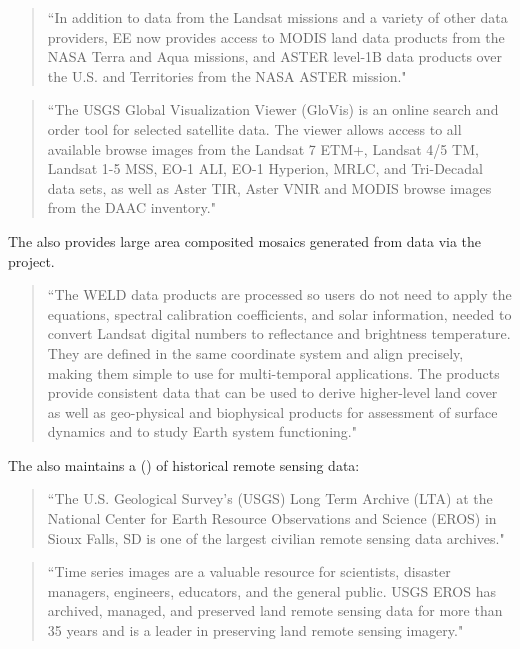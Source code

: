 \documentclass{article}
\begin{document}
\begin{quote}
``In addition to data from the Landsat missions and a variety of other data
providers, EE now provides access to MODIS land data products from the NASA
Terra and Aqua missions, and ASTER level-1B data products over the U.S. and
Territories from the NASA ASTER mission."
\end{quote}

\begin{quote}
``The USGS Global Visualization Viewer (GloVis) is an online search and order
tool for selected satellite data. The viewer allows access to all available
browse images from the Landsat 7 ETM+, Landsat 4/5 TM, Landsat 1-5 MSS,
EO-1 ALI, EO-1 Hyperion, MRLC, and Tri-Decadal data sets, as well as Aster
TIR, Aster VNIR and MODIS browse images from the DAAC inventory."
\end{quote}

The \cite{usgs} also provides large area composited mosaics generated from
\cite{landsat} data via the \cite{weld} project.

\begin{quote}
``The WELD data products are processed so users do not need to apply the
equations, spectral calibration coefficients, and solar information, needed
to convert Landsat digital numbers to reflectance and brightness temperature.
They are defined in the same coordinate system and align precisely, making
them simple to use for multi-temporal applications.
The products provide consistent data that can be used to derive higher-level
land cover as well as geo-physical and biophysical products for assessment
of surface dynamics and to study Earth system functioning."
\end{quote}

The \cite{usgs} also maintains a  (\cite{usgs-lta})
of historical remote sensing data:

\begin{quote}
``The U.S. Geological Survey's (USGS) Long Term Archive (LTA) at the National
Center for Earth Resource Observations and Science (EROS) in Sioux Falls,
SD is one of the largest civilian remote sensing data archives."
\end{quote}

\begin{quote}
``Time series images are a valuable resource for scientists, disaster
managers, engineers, educators, and the general public. USGS EROS has
archived, managed, and preserved land remote sensing data for more than 35
years and is a leader in preserving land remote sensing imagery."
\end{quote}
\end{document}
